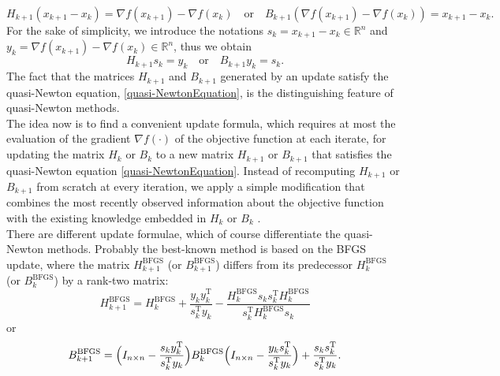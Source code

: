 \begin{equation*}
    H_{k+1} (x_{k+1} - x_k) = \nabla f(x_{k+1}) - \nabla f(x_k) \quad \text{or} \quad B_{k+1} (\nabla f(x_{k+1}) - \nabla f(x_k)) = x_{k+1} - x_k.
\end{equation*}
For the sake of simplicity, we introduce the notations $s_k = x_{k+1} - x_k \in \mathbb{R}^n$ and $y_k = \nabla f(x_{k+1}) - \nabla f(x_k) \in \mathbb{R}^n$, thus we obtain
\begin{equation}\label{quasi-NewtonEquation}
    H_{k+1} s_k = y_k \quad \text{or} \quad B_{k+1} y_k = s_k.
\end{equation}
The fact that the matrices $H_{k+1}$ and $B_{k+1}$ generated by an update satisfy the quasi-Newton equation, \cref{quasi-NewtonEquation}, is the distinguishing feature of quasi-Newton methods. \\
The idea now is to find a convenient update formula, which requires at most the evaluation of the gradient $\nabla f(\cdot)$ of the objective function at each iterate, for updating the matrix $H_k$ or $B_k$ to a new matrix $H_{k+1}$ or $B_{k+1}$ that satisfies the quasi-Newton equation \cref{quasi-NewtonEquation}. Instead of recomputing $H_{k+1}$ or $B_{k+1}$ from scratch at every iteration, we apply a simple modification that combines the most recently observed information about the objective function with the existing knowledge embedded in $H_k$ or $B_k$ \cite[p.~139]{NocedalWright:2006}. \\
There are different update formulae, which of course differentiate the quasi-Newton methods. Probably the best-known method is based on the BFGS update, where the matrix $H^{\mathrm{BFGS}}_{k+1}$ (or $B^{\mathrm{BFGS}}_{k+1}$) differs from its predecessor $H^{\mathrm{BFGS}}_k$ (or $B^{\mathrm{BFGS}}_k$) by a rank-two matrix:
\begin{equation}\label{DirectBFGSformula}
    H^{\mathrm{BFGS}}_{k+1} = H^{\mathrm{BFGS}}_k + \frac{y_k y^{\mathrm{T}}_k}{s^{\mathrm{T}}_k y_k} - \frac{H^{\mathrm{BFGS}}_k s_k s^{\mathrm{T}}_k H^{\mathrm{BFGS}}_k}{s^{\mathrm{T}}_k H^{\mathrm{BFGS}}_k s_k}
\end{equation}
or 
\begin{equation}\label{InverseBFGSformula}
    B^{\mathrm{BFGS}}_{k+1} = \Big{(} I_{n \times n} - \frac{s_k y^{\mathrm{T}}_k}{s_k^{\mathrm{T}} y_k} \Big{)} B^{\mathrm{BFGS}}_k \Big{(} I_{n \times n} - \frac{y_k s^{\mathrm{T}}_k}{s_k^{\mathrm{T}} y_k} \Big{)} + \frac{s_k s^{\mathrm{T}}_k}{s_k^{\mathrm{T}} y_k}.
\end{equation}
